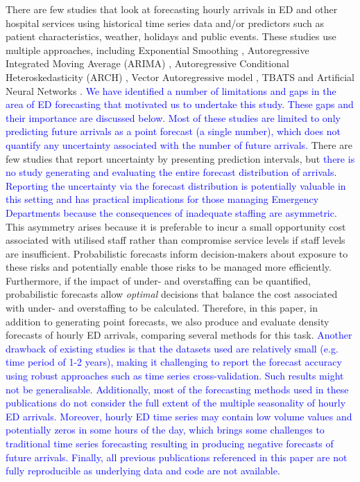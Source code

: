 \documentclass[]{elsarticle} %
\begin{document}
There are few studies that look at forecasting hourly arrivals in ED and
other hospital services using historical time series data and/or
predictors such as patient characteristics, weather, holidays and public
events. These studies use multiple approaches, including Exponential
Smoothing \citep{SvetunkovAdam}, Autoregressive Integrated Moving Average
(ARIMA) \citep{hyndman2021forecasting}, Autoregressive Conditional
Heteroskedasticity (ARCH) \citep{bollerslev1994arch}, Vector Autoregressive
model \citep{lutkepohl2013vector}, TBATS \citep{de2011forecasting} and Artificial
Neural Networks \citep{hyndman2021forecasting}. \textcolor{blue}{We have identified a number of limitations and gaps in the area of ED forecasting that motivated us to undertake this study. These gaps and their importance are discussed below.} \textcolor{blue}{Most of these studies are limited to only predicting future arrivals as a point
forecast (a single number), which does not quantify any uncertainty associated with the number of future arrivals.} There are few studies that report uncertainty by presenting prediction intervals, but \textcolor{blue}{there is no study generating and evaluating the entire forecast distribution of arrivals. Reporting the uncertainty via the forecast distribution is potentially valuable in this setting and has practical implications for those managing Emergency Departments because the consequences of inadequate staffing are asymmetric}. This asymmetry arises because it is preferable to incur a small opportunity cost associated with utilised staff rather than compromise service levels if staff levels are insufficient. Probabilistic forecasts inform decision-makers about exposure to these risks and potentially enable those risks to be managed more efficiently. Furthermore, if the impact of under- and overstaffing can be quantified,
probabilistic forecasts allow \emph{optimal} decisions that balance the cost associated with under- and overstaffing to be calculated. Therefore, in this paper, in addition to generating point forecasts, we also produce and evaluate density forecasts of hourly ED arrivals, comparing several methods for this task. \textcolor{blue}{Another drawback of existing studies is that the
datasets used are relatively small (e.g. time period of 1-2 years), making it challenging to report the forecast accuracy using robust approaches such as time series cross-validation. Such results might not be generalisable. Additionally, most of the forecasting methods used in these publications do not consider the full extent of the multiple seasonality of hourly ED arrivals. Moreover, hourly ED time series may contain low volume values and potentially zeros in some hours of the day, which brings some challenges to traditional time series forecasting resulting in producing negative forecasts of future arrivals.
Finally, all previous publications
referenced in this paper are not fully reproducible as underlying data and code are not available.}
\end{document}
